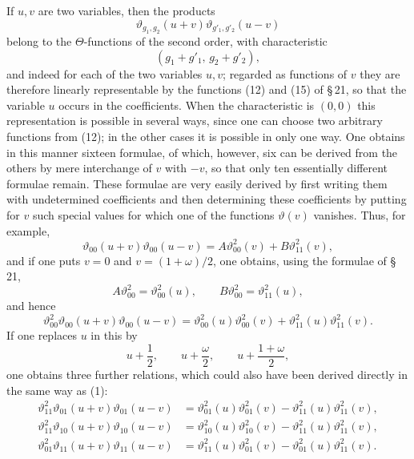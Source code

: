 \documentclass[11pt]{article}
\providecommand{\tht}{\vartheta}
\begin{document}
If $u,v$ are two variables, then the products
\[
\tht_{g_1,g_2}(u+v)\tht_{g'_1,g'_2}(u-v)
\]
belong to the $\Theta$-functions of the second order, with characteristic
\[
(g_1+g'_1,\,g_2+g'_2),
\]
and indeed for each of the two variables $u,v$; regarded as functions of $v$ they are therefore linearly representable by the functions (12) and (15) of \S\,21, so that the variable $u$ occurs in the coefficients. When the characteristic is $(0,0)$ this representation is possible in several ways, since one can choose two arbitrary functions from (12); in the other cases it is possible in only one way. One obtains in this manner sixteen formulae, of which, however, six can be derived from the others by mere interchange of $v$ with $-v$, so that only ten essentially different formulae remain. These formulae are very easily derived by first writing them with undetermined coefficients and then determining these coefficients by putting for $v$ such special values for which one of the functions $\tht(v)$ vanishes. Thus, for example,
\[
\tht_{00}(u+v)\tht_{00}(u-v)=A\tht_{00}^{2}(v)+B\tht_{11}^{2}(v),
\]
and if one puts $v=0$ and $v=(1+\omega)/2$, one obtains, using the formulae of \S\,21,
\[
A\tht_{00}^{2}=\tht_{00}^{2}(u),\qquad B\tht_{00}^{2}=\tht_{11}^{2}(u),
\]
and hence
\begin{equation}
\tht_{00}^{2}\tht_{00}(u+v)\tht_{00}(u-v)
=\tht_{00}^{2}(u)\tht_{00}^{2}(v)+\tht_{11}^{2}(u)\tht_{11}^{2}(v).
\tag{1}
\end{equation}
If one replaces $u$ in this by
\[
u+\frac12,\qquad u+\frac{\omega}{2},\qquad u+\frac{1+\omega}{2},
\]
one obtains three further relations, which could also have been derived directly in the same way as (1):
\begin{align}
\tht_{11}^{2}\tht_{01}(u+v)\tht_{01}(u-v)
&=\tht_{01}^{2}(u)\tht_{01}^{2}(v)-\tht_{11}^{2}(u)\tht_{11}^{2}(v), \tag{2}\\
\tht_{11}^{2}\tht_{10}(u+v)\tht_{10}(u-v)
&=\tht_{10}^{2}(u)\tht_{10}^{2}(v)-\tht_{11}^{2}(u)\tht_{11}^{2}(v), \tag{3}\\
\tht_{01}^{2}\tht_{11}(u+v)\tht_{11}(u-v)
&=\tht_{11}^{2}(u)\tht_{01}^{2}(v)-\tht_{01}^{2}(u)\tht_{11}^{2}(v). \tag{4}
\end{align}
\end{document}
